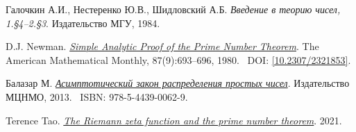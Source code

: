 \thispagestyle{supplementary}

\begingroup
    \renewcommand{\section}[2]{\subsection#1{#2}}%

    \begin{thebibliography}{4}
            Галочкин А.И., Нестеренко Ю.В., Шидловский А.Б. 
            \textit{Введение в теорию чисел, 1.\S4--2.\S3}. 
            Издательство МГУ, 1984.

            D.J. Newman. 
            \href{https://www.math.stonybrook.edu/~moira/mat331-spr10/papers/1980%20NewmanSimple%20Analytic%20Proof%20of%20the.pdf}{\textit{Simple Analytic Proof of the Prime Number Theorem}}. 
            The American Mathematical Monthly, 87(9):693--696, 1980.~\newline
            DOI: \href{https://doi.org/10.2307/2321853}{[10.2307/2321853]}.

            Балазар М. 
            \href{https://www.mccme.ru/free-books/dubna/balazard.pdf}{\textit{Асимптотический закон распределения простых чисел}}. 
            Издательство МЦНМО, 2013.~\newline
            ISBN: 978-5-4439-0062-9.

            Terence Tao. 
            \href{https://terrytao.wordpress.com/2021/02/12/246b-notes-4-the-riemann-zeta-function-and-the-prime-number-theorem/}{\textit{The Riemann zeta function and the prime number theorem}}. 
            2021.
    \end{thebibliography}
\endgroup

